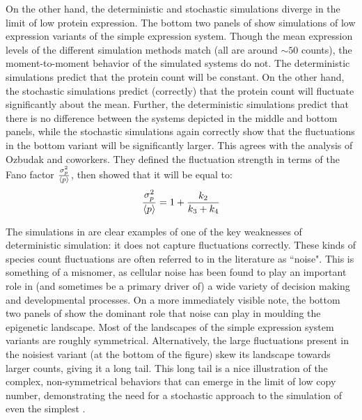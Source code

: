 On the other hand, the deterministic and stochastic simulations diverge in the limit of low protein expression. The bottom two panels of  show simulations of low expression variants of the simple expression system. Though the mean expression levels of the different simulation methods match (all are around ${\sim}50$ counts), the moment-to-moment behavior of the simulated systems do not. The deterministic simulations predict that the protein count will be constant. On the other hand, the stochastic simulations predict (correctly) that the protein count will fluctuate significantly about the mean. Further, the deterministic simulations predict that there is no difference between the systems depicted in the middle and bottom panels, while the stochastic simulations again correctly show that the fluctuations in the bottom variant will be significantly larger. This agrees with the analysis of Ozbudak and coworkers\cite{Ozbudak:2002iq}. They defined the fluctuation strength in terms of the Fano factor $\frac{\sigma^{2}_{p}}{\left\langle p \right\rangle}$, then showed that it will be equal to:
\begin{equation}\label{eq:simple_expression_noise_strength}
    \frac{\sigma^{2}_{p}}{\left\langle p \right\rangle} = 1 + \frac{k_{2}}{k_{3} + k_{4}}
\end{equation}

The simulations in  are clear examples of one of the key weaknesses of deterministic simulation: it does not capture fluctuations correctly. These kinds of species count fluctuations are often referred to in the literature as ``noise"\cite{Elowitz:2002hb}. This is something of a misnomer, as cellular noise has been found to play an important role in (and sometimes be a primary driver of\cite{Jaruszewicz:2013fe,Ahrends:2014bm}) a wide variety of decision making\cite{Andrews:2007gu,Balazsi:2011bw} and developmental processes\cite{Pujadas:2012dj}. On a more immediately visible note, the bottom two panels of  show the dominant role that noise can play in moulding the epigenetic landscape. Most of the landscapes of the simple expression system variants are roughly symmetrical. Alternatively, the large fluctuations present in the noisiest variant (at the bottom of the figure) skew its landscape towards larger counts, giving it a long tail. This long tail is a nice illustration of the complex, non-symmetrical behaviors that can emerge in the limit of low copy number, demonstrating the need for a stochastic approach to the simulation of even the simplest .

